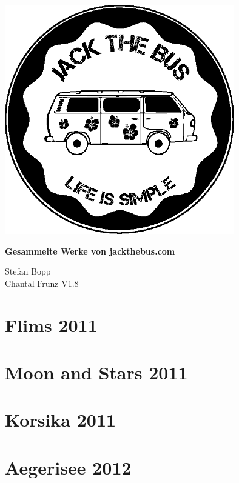 \documentclass[11pt,nswissgerman]{article}
\begin{document}
\begin{titlepage}
\centering
\includegraphics[width=10cm]{../Bilder/Logo/Logo.png} \\
\vspace{2cm}
{\huge\bfseries Gesammelte Werke von jackthebus.com\par}
\vspace{2cm}
{\Large Stefan Bopp} \\
{\Large Chantal Frunz}
\vfill
{\large V1.8}
\thispagestyle{empty}

\end{titlepage}

\newpage
\lhead{\leftmark}

\cfoot{\thepage}

\tableofcontents
\newpage
\section{Flims 2011}

\newpage
\section{Moon and Stars 2011}

\newpage
\section{Korsika 2011}

\newpage
\section{Aegerisee 2012}

\newpage
\end{document}

